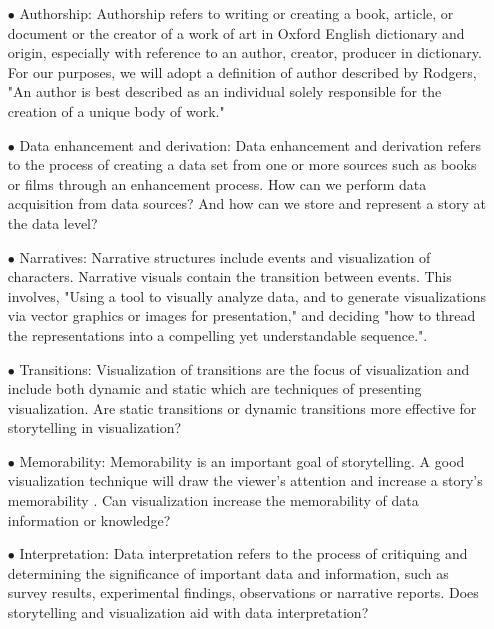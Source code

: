 \documentclass{egpubl}
\begin{document}
\begin{enumerate}
	\item[$\bullet$] Authorship: Authorship refers to writing or creating a book, article, or document or the creator of a work of art in Oxford English dictionary\cite{authoship2} and origin, especially with reference to an author, creator, producer in dictionary\cite{authoship1}. For our purposes, we will adopt a definition of author described by Rodgers\cite{rodgers2011}, "An author is best described as an individual solely responsible for the creation of a unique body of work."
	\item[$\bullet$] Data enhancement and derivation: Data enhancement and derivation refers to the process of creating a data set from one or more sources such as books or films through an enhancement process. How can we perform data acquisition from data sources? And how can we store and represent a story at the data level?
	\item[$\bullet$] Narratives: Narrative structures include events and visualization of characters. Narrative visuals contain the transition between events. This involves, "Using a tool to visually analyze data, and to generate visualizations via vector graphics or images for presentation," and deciding "how to thread the representations into a compelling yet understandable sequence."\cite{hullman2013deeper}.
	
	\item[$\bullet$] Transitions: Visualization of transitions are the focus of visualization and include both dynamic and static which are techniques of presenting visualization. Are static transitions or dynamic transitions more effective for storytelling in visualization?
	
	\item[$\bullet$]Memorability: Memorability is an important goal of storytelling. A good visualization technique will draw the viewer's attention and increase a story's memorability \cite{bateman}. Can visualization increase the memorability of data information or knowledge?
	
	\item[$\bullet$] Interpretation: Data interpretation refers to the process of critiquing and determining the significance of important data and information, such as survey results, experimental findings, observations or narrative reports. Does storytelling and visualization aid with data interpretation? 
	
\end{enumerate}
\end{document}
